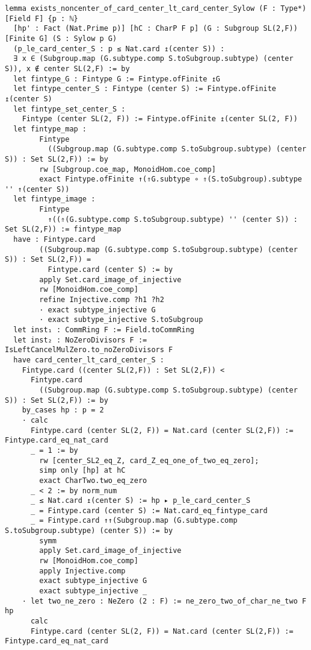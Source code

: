\begin{tiny}
\begin{verbatim}
lemma exists_noncenter_of_card_center_lt_card_center_Sylow (F : Type*) [Field F] {p : ℕ}
  [hp' : Fact (Nat.Prime p)] [hC : CharP F p] (G : Subgroup SL(2,F)) [Finite G] (S : Sylow p G)
  (p_le_card_center_S : p ≤ Nat.card ↥(center S)) :
  ∃ x ∈ (Subgroup.map (G.subtype.comp S.toSubgroup.subtype) (center S)), x ∉ center SL(2,F) := by
  let fintype_G : Fintype G := Fintype.ofFinite ↥G
  let fintype_center_S : Fintype (center S) := Fintype.ofFinite ↥(center S)
  let fintype_set_center_S :
    Fintype (center SL(2, F)) := Fintype.ofFinite ↥(center SL(2, F))
  let fintype_map :
        Fintype
          ((Subgroup.map (G.subtype.comp S.toSubgroup.subtype) (center S)) : Set SL(2,F)) := by
        rw [Subgroup.coe_map, MonoidHom.coe_comp]
        exact Fintype.ofFinite ↑(⇑G.subtype ∘ ⇑(S.toSubgroup).subtype '' ↑(center S))
  let fintype_image :
        Fintype
          ↑((⇑(G.subtype.comp S.toSubgroup.subtype) '' (center S)) : Set SL(2,F)) := fintype_map
  have : Fintype.card
        ((Subgroup.map (G.subtype.comp S.toSubgroup.subtype) (center S)) : Set SL(2,F)) =
          Fintype.card (center S) := by
        apply Set.card_image_of_injective
        rw [MonoidHom.coe_comp]
        refine Injective.comp ?h1 ?h2
        · exact subtype_injective G
        · exact subtype_injective S.toSubgroup
  let inst₁ : CommRing F := Field.toCommRing
  let inst₂ : NoZeroDivisors F := IsLeftCancelMulZero.to_noZeroDivisors F
  have card_center_lt_card_center_S :
    Fintype.card ((center SL(2,F)) : Set SL(2,F)) <
      Fintype.card
        ((Subgroup.map (G.subtype.comp S.toSubgroup.subtype) (center S)) : Set SL(2,F)) := by
    by_cases hp : p = 2
    · calc
      Fintype.card (center SL(2, F)) = Nat.card (center SL(2,F)) := Fintype.card_eq_nat_card
      _ = 1 := by
        rw [center_SL2_eq_Z, card_Z_eq_one_of_two_eq_zero];
        simp only [hp] at hC
        exact CharTwo.two_eq_zero
      _ < 2 := by norm_num
      _ ≤ Nat.card ↥(center S) := hp ▸ p_le_card_center_S
      _ = Fintype.card (center S) := Nat.card_eq_fintype_card
      _ = Fintype.card ↑↑(Subgroup.map (G.subtype.comp S.toSubgroup.subtype) (center S)) := by
        symm
        apply Set.card_image_of_injective
        rw [MonoidHom.coe_comp]
        apply Injective.comp
        exact subtype_injective G
        exact subtype_injective _
    · let two_ne_zero : NeZero (2 : F) := ne_zero_two_of_char_ne_two F hp
      calc
      Fintype.card (center SL(2, F)) = Nat.card (center SL(2,F)) := Fintype.card_eq_nat_card

\end{verbatim}
\end{tiny}
